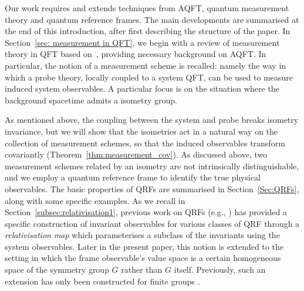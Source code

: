 \documentclass[sn-mathphys-num]{sn-jnl}%
\numberwithin{equation}{section}
\theoremstyle{thmstyleone}%
\theoremstyle{thmstyletwo}%
\theoremstyle{thmstylethree}%
\begin{document}
Our work requires and extends techniques from AQFT, quantum measurement theory and quantum reference frames. The main developments are summarised at the end of this introduction, after first describing the structure of the paper. In Section~\ref{sec: measurement in QFT}, we begin with a review of measurement theory in QFT based on~\cite{FewVer_QFLM:2018}, providing necessary background on AQFT. In particular, the notion of a measurement scheme is recalled: namely the way in which a probe theory, locally coupled to a system QFT, can be used to measure induced system observables. A particular focus is on the situation where the background spacetime admits a isometry group. 

As mentioned above, the coupling between the system and probe breaks isometry invariance, but we will show that the isometries act in a natural way on the collection of measurement schemes, so that the induced observables transform covariantly (Theorem~\ref{thm:measurement_cov}).
As discussed above, two measurement schemes related by an isometry are not intrinsically distinguishable, and 
we employ a quantum reference frame to identify the true physical observables. The basic properties of QRFs are summarised in Section~\ref{Sec:QRFs}, along with some specific examples. As we recall in Section~\ref{subsec:relativisation1}, previous work on QRFs (e.g., \cite{miyadera2016approximating,Loveridge2017a,glowacki2023quantum}) has provided a specific construction of invariant observables for various classes of QRF through a \emph{relativisation map} which parameterises a subclass of the invariants using the system observables. Later in the present paper, this notion is extended to the setting in which the frame observable's value space is a certain homogeneous space of the symmetry group $G$ rather than $G$ itself. Previously, such an extension has only been constructed for finite groups \cite{glowacki2023quantum}.
\end{document}
